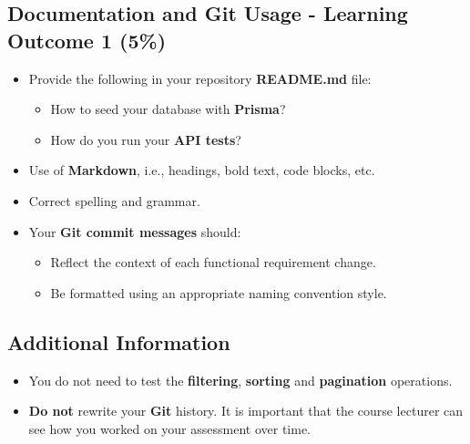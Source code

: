 \documentclass{article}
\begin{document}
\subsection*{Documentation and Git Usage - Learning Outcome 1 (5\%)}
\begin{itemize}
    \item Provide the following in your repository \textbf{README.md} file:
    \begin{itemize} 
      \item How to seed your database with \textbf{Prisma}?
      \item How do you run your \textbf{API tests}?
    \end{itemize}
    \item Use of \textbf{Markdown}, i.e., headings, bold text, code blocks, etc.
    \item Correct spelling and grammar.
    \item Your \textbf{Git commit messages} should:
    \begin{itemize}
      \item Reflect the context of each functional requirement change.
      \item Be formatted using an appropriate naming convention style.
    \end{itemize}	
\end{itemize} 
          
\subsection*{Additional Information}
\begin{itemize}
    \item You do not need to test the \textbf{filtering}, \textbf{sorting} and \textbf{pagination} operations.
    \item \textbf{Do not} rewrite your \textbf{Git} history. It is important that the course lecturer can see how you worked on your assessment over time. 
\end{itemize} 
\end{document}
